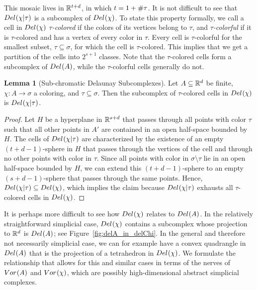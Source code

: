 \documentclass[a4paper]{article}
\newcommand {\mm}[1]   {\ifmmode{#1}\else{\mbox{\(#1\)}}\fi}
\newcommand{\Rspace}        {\mm{{\mathbb R}}}
\newcommand{\Voronoi}[2]    {\mm{{\rm Vor}_{#1}{({#2})}}}
\newcommand{\Delaunay}[2]   {\mm{{\rm Del}_{#1}{({#2})}}}
\newcommand{\card}[1]       {\mm{{\#}{#1}}}
\theoremstyle{definition}
\numberwithin{theorem}{section}
\newtheorem{lemma}[theorem]{Lemma}
\numberwithin{equation}{section}
\begin{document}
This mosaic lives in $\Rspace^{t+d}$, in which $t = 1+\card{\tau}$.
It is not difficult to see that $\Delaunay{}{\chi|\tau}$ is a subcomplex of $\Delaunay{}{\chi}$.
To state this property formally, we call a cell in $\Delaunay{}{\chi}$ \emph{$\tau$-colored} if the colors of its vertices belong to $\tau$, and \emph{$\tau$-colorful} if it is $\tau$-colored and has a vertex of every color in $\tau$.
Every cell is $\tau$-colorful for the smallest subset, $\tau \subseteq \sigma$, for which the cell is $\tau$-colored.
This implies that we get a partition of the cells into $2^{s+1}$ classes. 
Note that the $\tau$-colored cells form a subcomplex of $\Delaunay{}{A}$, while the $\tau$-colorful cells generally do not. 
\begin{lemma}[Sub-chromatic Delaunay Subcomplexes]
  \label{lem:sub-chromatic_Delaunay_subcomplexes}
  Let $A \subseteq \Rspace^d$ be finite, $\chi \colon A \to \sigma$ a coloring, and $\tau \subseteq \sigma$.
  Then the subcomplex of $\tau$-colored cells in $\Delaunay{}{\chi}$ is $\Delaunay{}{\chi|\tau}$.
\end{lemma}
\begin{proof}
  Let $H$ be a hyperplane in $\Rspace^{s+d}$ that passes through all points with color $\tau$ such that all other points in $A'$ are contained in an open half-space bounded by $H$.
  The cells of $\Delaunay{}{\chi|\tau}$ are characterized by the existence of an empty $(t+d-1)$-sphere in $H$ that passes through the vertices of the cell and through no other points with color in $\tau$.
  Since all points with color in $\sigma \setminus \tau$ lie in an open half-space bounded by $H$, we can extend this $(t+d-1)$-sphere to an empty $(s+d-1)$-sphere that passes through the same points.
  Hence, $\Delaunay{}{\chi|\tau} \subseteq \Delaunay{}{\chi}$, which implies the claim because $\Delaunay{}{\chi|\tau}$ exhausts all $\tau$-colored cells in $\Delaunay{}{\chi}$.
\end{proof}

It is perhaps more difficult to see how $\Delaunay{}{\chi}$ relates to $\Delaunay{}{A}$.
In the relatively straightforward simplicial case, $\Delaunay{}{\chi}$ contains a subcomplex whose projection to $\Rspace^d$ is $\Delaunay{}{A}$; see Figure~\ref{fig:delA_in_delChi}.
In the general and therefore not necessarily simplicial case, we can for example have a convex quadrangle in $\Delaunay{}{A}$ that is the projection of a tetrahedron in $\Delaunay{}{\chi}$.
We formulate the relationship that allows for this and similar cases  in terms of the nerves of $\Voronoi{}{A}$ and $\Voronoi{}{\chi}$, which are possibly high-dimensional abstract simplicial complexes.
\end{document}
